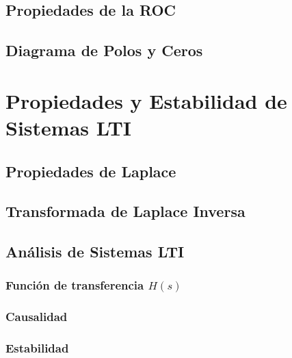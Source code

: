 \documentclass[11pt,a4paper,openany]{book}
\begin{document}
\section{Propiedades de la ROC}

\section{Diagrama de Polos y Ceros}

\chapter{Propiedades y Estabilidad de Sistemas LTI}

\section{Propiedades de Laplace}

\section{Transformada de Laplace Inversa}

\section{Análisis de Sistemas LTI}

\subsection{Función de transferencia $H(s)$}

\subsection{Causalidad}

\subsection{Estabilidad}
\end{document}

